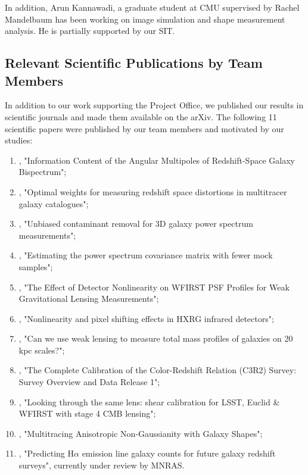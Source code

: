 In addition, Arun Kannawadi, a graduate student at CMU supervised by Rachel Mandelbaum has been working on image simulation and shape measurement analysis. He is partially supported by our SIT.

\subsection{Relevant Scientific Publications by Team Members}

In addition to our work supporting the Project Office, we published our results in scientific journals and made them available on the arXiv. The following 11 scientific papers were published by our team members and motivated by our studies:

\begin{enumerate}
\item \citet{2017MNRAS.467..928G}, "Information Content of the Angular Multipoles of Redshift-Space Galaxy Bispectrum";
\item \citet{2016MNRAS.463.2708P}, "Optimal weights for measuring redshift space distortions in multitracer galaxy catalogues";
\item \citet{2016MNRAS.463..467K}, "Unbiased contaminant removal for 3D galaxy power spectrum measurements";
\item \citet{2016MNRAS.457..993P}, "Estimating the power spectrum covariance matrix with fewer mock samples";
\item \citet{2016PASP..128j4001P}, "The Effect of Detector Nonlinearity on WFIRST PSF Profiles for Weak Gravitational Lensing Measurements";
\item \citet{2017JInst..12C4009P}, "Nonlinearity and pixel shifting effects in HXRG infrared detectors";
\item \citet{2015MNRAS.449.2128K}, "Can we use weak lensing to measure total mass profiles of galaxies on 20 kpc scales?";
\item \citet{2017arXiv170406665M}, "The Complete Calibration of the Color-Redshift Relation (C3R2) Survey: Survey Overview and Data Release 1";
\item \citet{Schaan:2016ois}, "Looking through the same lens: shear calibration for LSST, Euclid \& WFIRST with stage 4 CMB lensing";
\item \citet{Chisari:2016xki}, "Multitracing Anisotropic Non-Gaussianity with Galaxy Shapes";
\item \citet{Merson2017}, "Predicting H$\alpha$ emission line galaxy counts for future galaxy redshift surveys", currently under review by MNRAS.
\end{enumerate}

